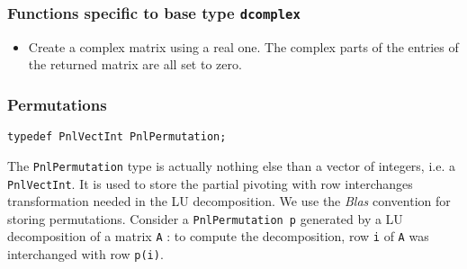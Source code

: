 \subsubsection{Functions specific to base type {\tt dcomplex}}

\begin{itemize}
  \item {}
    \sshortdescribe Create a complex matrix using a real one. The complex parts
    of the entries of the returned matrix are all set to zero.
\end{itemize}

\subsubsection{Permutations}

\begin{verbatim}
typedef PnlVectInt PnlPermutation;
\end{verbatim}

The \verb!PnlPermutation! type is actually nothing else than a vector of
integers, i.e. a \verb!PnlVectInt!. It is used to store the partial pivoting
with row interchanges transformation needed in the LU decomposition.  We use the
{\it Blas} convention for storing permutations. Consider a \verb!PnlPermutation p!
generated by a LU decomposition of a matrix \verb!A! : to compute the
decomposition, row \verb!i! of \verb!A! was interchanged with row \verb!p(i)!.


